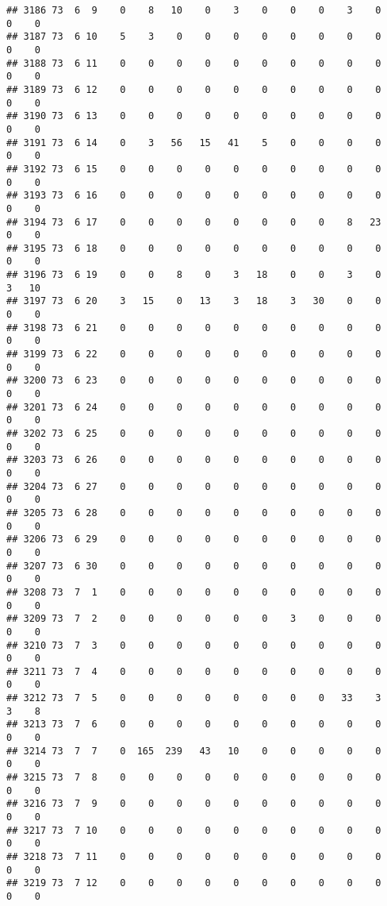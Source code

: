 \documentclass[]{article}
\begin{document}
\begin{verbatim}
## 3186 73  6  9    0    8   10    0    3    0    0    0    3    0    0    0
## 3187 73  6 10    5    3    0    0    0    0    0    0    0    0    0    0
## 3188 73  6 11    0    0    0    0    0    0    0    0    0    0    0    0
## 3189 73  6 12    0    0    0    0    0    0    0    0    0    0    0    0
## 3190 73  6 13    0    0    0    0    0    0    0    0    0    0    0    0
## 3191 73  6 14    0    3   56   15   41    5    0    0    0    0    0    0
## 3192 73  6 15    0    0    0    0    0    0    0    0    0    0    0    0
## 3193 73  6 16    0    0    0    0    0    0    0    0    0    0    0    0
## 3194 73  6 17    0    0    0    0    0    0    0    0    8   23    0    0
## 3195 73  6 18    0    0    0    0    0    0    0    0    0    0    0    0
## 3196 73  6 19    0    0    8    0    3   18    0    0    3    0    3   10
## 3197 73  6 20    3   15    0   13    3   18    3   30    0    0    0    0
## 3198 73  6 21    0    0    0    0    0    0    0    0    0    0    0    0
## 3199 73  6 22    0    0    0    0    0    0    0    0    0    0    0    0
## 3200 73  6 23    0    0    0    0    0    0    0    0    0    0    0    0
## 3201 73  6 24    0    0    0    0    0    0    0    0    0    0    0    0
## 3202 73  6 25    0    0    0    0    0    0    0    0    0    0    0    0
## 3203 73  6 26    0    0    0    0    0    0    0    0    0    0    0    0
## 3204 73  6 27    0    0    0    0    0    0    0    0    0    0    0    0
## 3205 73  6 28    0    0    0    0    0    0    0    0    0    0    0    0
## 3206 73  6 29    0    0    0    0    0    0    0    0    0    0    0    0
## 3207 73  6 30    0    0    0    0    0    0    0    0    0    0    0    0
## 3208 73  7  1    0    0    0    0    0    0    0    0    0    0    0    0
## 3209 73  7  2    0    0    0    0    0    0    3    0    0    0    0    0
## 3210 73  7  3    0    0    0    0    0    0    0    0    0    0    0    0
## 3211 73  7  4    0    0    0    0    0    0    0    0    0    0    0    0
## 3212 73  7  5    0    0    0    0    0    0    0    0   33    3    3    8
## 3213 73  7  6    0    0    0    0    0    0    0    0    0    0    0    0
## 3214 73  7  7    0  165  239   43   10    0    0    0    0    0    0    0
## 3215 73  7  8    0    0    0    0    0    0    0    0    0    0    0    0
## 3216 73  7  9    0    0    0    0    0    0    0    0    0    0    0    0
## 3217 73  7 10    0    0    0    0    0    0    0    0    0    0    0    0
## 3218 73  7 11    0    0    0    0    0    0    0    0    0    0    0    0
## 3219 73  7 12    0    0    0    0    0    0    0    0    0    0    0    0

\end{verbatim}
\end{document}
